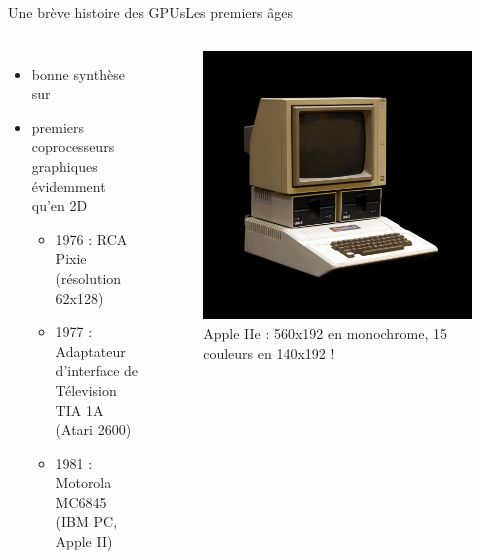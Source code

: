 \documentclass[11pt,mathserif]{beamer}
\begin{document}
\begin{frame}{Une brève histoire des GPUs}{Les premiers âges}
  \begin{columns}[t]
    \column{7cm}
    \begin{itemize}[<+->]
      \item bonne synthèse sur \href{https://www.techspot.com/article/650-history-of-the-gpu/}{}
      \item premiers coprocesseurs graphiques évidemment qu'en 2D
        \begin{itemize}
          \item 1976 : RCA Pixie (résolution 62x128)
          \item 1977 : Adaptateur d'interface de Télevision TIA 1A (Atari 2600)
          \item 1981 : Motorola MC6845 (IBM PC, Apple II)
        \end{itemize}
    \end{itemize}
    \column{5cm}
    \begin{figure}[htbp]
  \includegraphics[width=0.8\linewidth]{fig/appleII.jpg}
    \caption{\tiny Apple IIe : 560x192 en monochrome, 15 couleurs en 140x192 !}
    \end{figure}
  \end{columns}
\end{frame}
\end{document}
